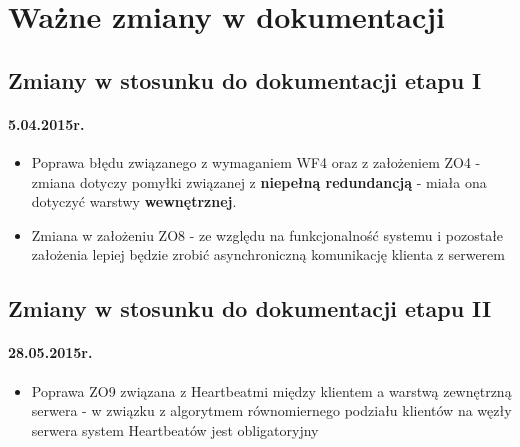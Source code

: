 \chapter{Ważne zmiany w dokumentacji}

\section{Zmiany w stosunku do dokumentacji etapu I}

\subsubsection*{5.04.2015r.}
\begin{itemize}
\item Poprawa błędu związanego z wymaganiem WF4 oraz z założeniem ZO4 - zmiana dotyczy pomyłki związanej z \textbf{niepełną redundancją} - miała ona dotyczyć warstwy \textbf{wewnętrznej}.
\item Zmiana w założeniu ZO8 - ze względu na funkcjonalność systemu i pozostałe założenia lepiej będzie zrobić asynchroniczną komunikację klienta z serwerem
\end{itemize}

\section{Zmiany w stosunku do dokumentacji etapu II}

\subsubsection*{28.05.2015r.}
\begin{itemize}
\item Poprawa ZO9 związana z Heartbeatmi między klientem a warstwą zewnętrzną serwera - w związku z algorytmem równomiernego podziału klientów na węzły serwera system Heartbeatów jest obligatoryjny
\end{itemize}